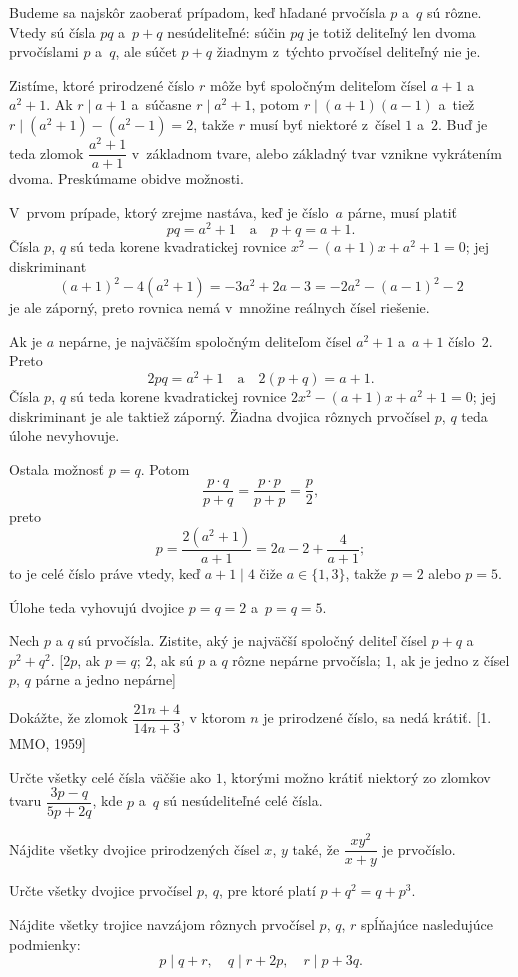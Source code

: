 ﻿{%
Budeme sa najskôr zaoberať prípadom, keď hľadané prvočísla $p$
a~$q$ sú rôzne. Vtedy sú čísla $pq$ a~$p+q$ nesúdeliteľné:
súčin $pq$ je totiž deliteľný len dvoma
prvočíslami $p$ a~$q$, ale súčet $p+q$ žiadnym z~týchto prvočísel
deliteľný nie je.

Zistíme, ktoré prirodzené číslo $r$ môže byť spoločným deliteľom čísel $a+1$
a~$a^2+1$. Ak $r\mid a+1$ a~súčasne
$r\mid a^2+1$, potom $r\mid (a+1)(a-1)$ a~tiež $r\mid (a^2+1)-(a^2-1)=2$, takže $r$ musí
byť niektoré z~čísel $1$ a~$2$. Buď je teda zlomok $\dfrac{a^2+1}{a+1}$ v~základnom tvare, alebo základný tvar vznikne vykrátením dvoma. Preskúmame obidve možnosti.

V~prvom prípade, ktorý zrejme nastáva, keď je číslo~$a$ párne, musí platiť
$$
pq=a^2+1\quad \text{a}\quad p+q=a+1.
$$
Čísla $p$, $q$ sú teda korene kvadratickej rovnice $x^2-(a+1)x+a^2+1=0$; jej diskriminant
$$
(a+1)^2-4(a^2+1)=-3a^2+2a-3=-2a^2-(a-1)^2-2
$$
je ale záporný, preto rovnica nemá v~množine reálnych čísel riešenie.

Ak je $a$ nepárne, je najväčším spoločným deliteľom čísel $a^2+1$ a~$a+1$ číslo~$2$. Preto
$$
2pq=a^2+1\quad \text{a}\quad 2(p+q)=a+1.
$$
Čísla $p$, $q$ sú teda korene
kvadratickej rovnice $2x^2-(a+1)x+a^2+1=0$; jej diskriminant je ale taktiež záporný.
Žiadna dvojica rôznych prvočísel $p$, $q$ teda úlohe nevyhovuje.

Ostala možnosť $p=q$. Potom
$$
\frac{p\cdot q}{p+q}=\frac{p\cdot p}{p+p}=\frac p2,
$$
preto
$$
p=\frac{2(a^2+1)}{a+1}=2a-2+\frac4{a+1};
$$
to je celé číslo práve vtedy, keď $a+1\mid 4$ čiže $a\in\{1, 3\}$, takže $p=2$ alebo
$p=5$.

Úlohe teda vyhovujú dvojice $p=q=2$ a~$p=q=5$.


Nech $p$ a $q$ sú prvočísla. Zistite, aký je najväčší spoločný deliteľ čísel $p+q$ a $p^2+q^2$.
[$2p$, ak $p=q$; $2$, ak sú $p$ a $q$ rôzne nepárne prvočísla; $1$, ak je jedno z čísel $p$, $q$ párne a jedno nepárne]

Dokážte, že zlomok $\dfrac{21n+4}{14n+3}$, v ktorom $n$ je prirodzené číslo, sa nedá krátiť.
[1. MMO, 1959]

Určte všetky celé čísla väčšie ako $1$, ktorými možno krátiť niektorý zo zlomkov tvaru $\dfrac{3p-q}{5p+2q}$, kde $p$ a~$q$ sú nesúdeliteľné celé čísla.
\vpravo{[58--A--S--3]}

Nájdite všetky dvojice prirodzených čísel $x$, $y$ také, že $\dfrac{xy^2}{x+y}$ je prvočíslo.
\vpravo{[58--A--I--3]}

Určte všetky dvojice prvočísel $p$, $q$, pre ktoré platí $p+q^2=q+p^3$.
\vpravo{[55--B--II--1]}

\D
Nájdite všetky trojice navzájom rôznych prvočísel $p$, $q$, $r$ spĺňajúce nasledujúce podmienky:
$$p\mid q+r,\quad  q\mid r+2p,\quad r\mid p+3q.$$
\vpravo{[55--A--III--5]}
}

